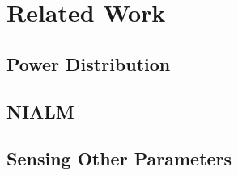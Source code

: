 \chapter{Related Work}
\section{Power Distribution}








\section{NIALM}






\section{Sensing Other Parameters}

% 
% 
% 

